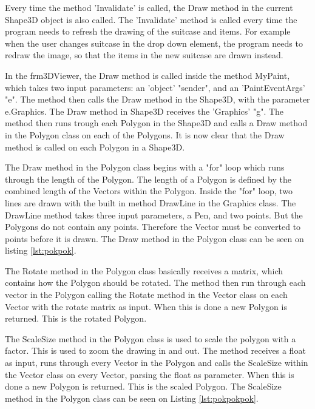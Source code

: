 Every time the method 'Invalidate' is called, the Draw method in the current Shape3D object is also called. The 'Invalidate' method is called every time the program needs to refresh the drawing of the suitcase and items. For example when the user changes suitcase in the drop down element, the program needs to redraw the image, so that the items in the new suitcase are drawn instead. 

In the frm3DViewer, the Draw method is called inside the method MyPaint, which takes two input parameters: an 'object' "sender", and an 'PaintEventArgs' "e". The method then calls the Draw method in the Shape3D, with the parameter e.Graphics. The Draw method in Shape3D receives the 'Graphics' "g". The method then runs trough each Polygon in the Shape3D and calls a Draw method in the Polygon class on each of the Polygons. It is now clear that the Draw method is called on each Polygon in a Shape3D.

The Draw method in the Polygon class begins with a "for" loop which runs through the length of the Polygon. The length of a Polygon is defined by the combined length of the Vectors within the Polygon. Inside the "for" loop, two lines are drawn with the built in method DrawLine in the Graphics class. The DrawLine method takes three input parameters, a Pen, and two points. But the Polygons do not contain any points. Therefore the Vector must be converted to points before it is drawn. The Draw method in the Polygon class can be seen on listing \ref{lst:pokpok}.

The Rotate method in the Polygon class basically receives a matrix, which contains how the Polygon should be rotated. The method then run through each vector in the Polygon calling the Rotate method in the Vector class on each Vector with the rotate matrix as input. When this is done a new Polygon is returned. This is the rotated Polygon.

The ScaleSize method in the Polygon class is used to scale the polygon with a factor. This is used to zoom the drawing in and out. The method receives a float as input, runs through every Vector in the Polygon and calls the ScaleSize within the Vector class on every Vector, parsing the float as parameter.  When this is done a new Polygon is returned. This is the scaled Polygon. The ScaleSize method in the Polygon class can be seen on Listing \ref{lst:pokpokpok}.

